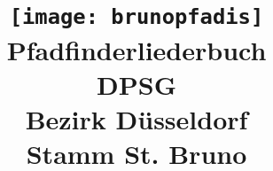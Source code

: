 \begin{titlepage}
\centering
\vfill
\vfill

\title{\texttt{[image: brunopfadis]}\\
\vspace{.5cm} \Huge{Pfadfinderliederbuch}\\
\vspace{.5cm} \large{DPSG}\\
Bezirk Düsseldorf\\
Stamm St. Bruno}

\date{}

\vfill
\vfill
\end{titlepage}
\maketitle

\thispagestyle{empty} 